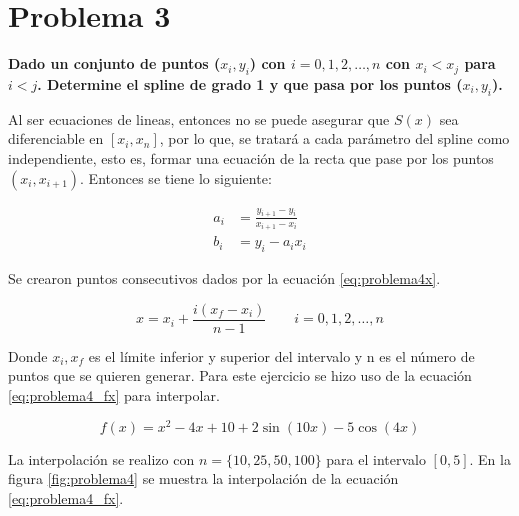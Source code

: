 \section*{Problema 3}

\textbf{Dado un conjunto de puntos ($x_i,y_i$) con $i=0,1,2,\dots,n$ con $x_i<x_j$ para $i<j$. Determine el spline de grado 1 y que pasa por los puntos ($x_i,y_i$).}

Al ser ecuaciones de lineas, entonces no se puede asegurar que $S(x)$ sea diferenciable en $[x_i,x_n]$, por lo que, se tratará a cada parámetro del spline como independiente, esto es, formar una ecuación de la recta que pase por los puntos $(x_i,x_{i+1})$. Entonces se tiene lo siguiente:

\begin{align}
    a_i & = \frac{y_{i+1}-y_{i}}{x_{i+1}-x_i} \label{eq:ai} \\
    b_i & = y_i - a_i x_i \label{eq:bi}
\end{align}

Se crearon puntos consecutivos dados por la ecuación \ref{eq:problema4x}.

\begin{equation}
    x = x_i + \frac{i(x_f-x_i)}{n-1} \qquad i=0,1,2,\dots,n \label{eq:problema4x}
\end{equation}

Donde $x_i,x_f$ es el límite inferior y superior del intervalo y n es el número de puntos que se quieren generar. Para este ejercicio se hizo uso de la ecuación \ref{eq:problema4_fx} para interpolar.

\begin{equation}
    f(x) = x^2-4x+10+2\sin ( 10x)-5 \cos (4x) \label{eq:problema4_fx}
\end{equation}

La interpolación se realizo con $n=\{10,25,50,100\}$ para el intervalo $[0,5]$. En la figura \ref{fig:problema4} se muestra la interpolación de la ecuación \ref{eq:problema4_fx}.

